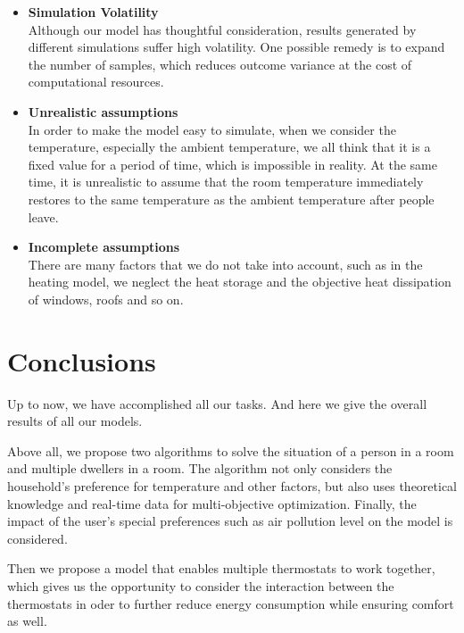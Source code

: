 \documentclass{mcmthesis}
\begin{document}
			\begin{itemize}
				
				\item \textbf{Simulation Volatility}\\
				Although our model has thoughtful consideration, results generated by different simulations suffer high volatility.
				One possible remedy is to expand the number of samples, which reduces outcome variance at the cost of computational resources.
				
				\item \textbf{Unrealistic assumptions}\\
				In order to make the model easy to simulate, when we consider the temperature, especially the ambient temperature, we all think that it is a fixed value for a period of time, which is impossible in reality. At the same time, it is unrealistic to assume that the room temperature immediately restores to the same temperature as the ambient temperature after people leave.
				
				\item \textbf{Incomplete assumptions}\\
				There are many factors that we do not take into account, such as in the heating model, we neglect the heat storage and the objective heat dissipation of windows, roofs and so on.
				
			\end{itemize}
		
	\section{Conclusions}
	
		Up to now, we have accomplished all our tasks. And here we give the overall results of all our models.
		
		Above all, we propose two algorithms to solve the situation of a person in a room and multiple dwellers in a room. The algorithm not only considers the household's preference for temperature and other factors, but also uses theoretical knowledge and real-time data for multi-objective optimization. Finally, the impact of the user's special preferences such as air pollution level on the model is considered. 
		
		Then we propose a model that enables multiple thermostats to work together, which gives us the opportunity to consider the interaction between the thermostats in oder to further reduce energy consumption while ensuring comfort as well.
		
\end{document}
